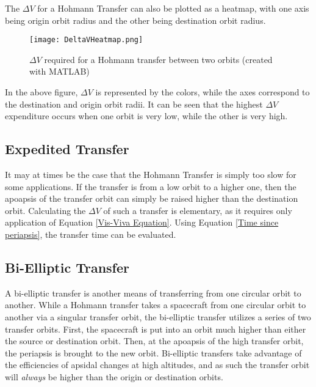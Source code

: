 \documentclass[../basicOrbitalDynamics.tex]{subfiles}
\begin{document}
The $\Delta V$ for a Hohmann Transfer can also be plotted as a heatmap, with one axis being origin orbit radius and the other being destination orbit radius.

\begin{figure}[H]
    \centering
    \texttt{[image: DeltaVHeatmap.png]}
    \caption{$\Delta V$ required for a Hohmann transfer between two orbits (created with MATLAB)}\label{fig:Delta V Heatmap}
\end{figure}

In the above figure, $\Delta V$ is represented by the colors, while the axes correspond to the destination and origin orbit radii. It can be seen that the highest $\Delta V$ expenditure occurs when one orbit is very low, while the other is very high.
\bigskip\bigskip
\subsection{Expedited Transfer}

It may at times be the case that the Hohmann Transfer is simply too slow for some applications. If the transfer is from a low orbit to a higher one, then the apoapsis of the transfer orbit can simply be raised higher than the destination orbit. Calculating the $\Delta V$ of such a transfer is elementary, as it requires only application of Equation \eqref{Vis-Viva Equation}. Using Equation \eqref{Time since periapsis}, the transfer time can be evaluated.

\bigskip\bigskip
\subsection{Bi-Elliptic Transfer}

A bi-elliptic transfer is another means of transferring from one circular orbit to another. While a Hohmann transfer takes a spacecraft from one circular orbit to another via a singular transfer orbit, the bi-elliptic transfer utilizes a series of two transfer orbits. First, the spacecraft is put into an orbit much higher than either the source or destination orbit. Then, at the apoapsis of the high transfer orbit, the periapsis is brought to the new orbit. Bi-elliptic transfers take advantage of the efficiencies of apsidal changes at high altitudes, and as such the transfer orbit will \textit{always} be higher than the origin or destination orbits.
\end{document}

